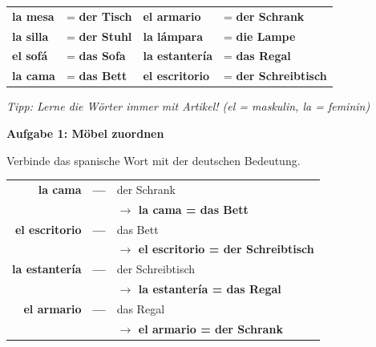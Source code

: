 \documentclass[11pt, a4paper]{article}
\newcommand{\fachfarbe}{spanisch}
\newcommand{\punktebox}[1]{\hfill\fbox{\small \_/#1}}
\newcommand{\loesung}[1]{\textcolor{loesung}{\textbf{#1}}}
\newenvironment{aufgabe}[1]{%
    \needspace{5\baselineskip}%
    \nopagebreak[4]%
    \vspace{10pt}
    \noindent\textbf{\textcolor{\fachfarbe}{Aufgabe #1}}
    \nopagebreak[4]%
    \vspace{5pt}
    \nopagebreak[4]%
    \begin{list}{}{\leftmargin=0pt}
    \item[]
}{%
    \end{list}
}
\newcommand{\es}[1]{\textcolor{\fachfarbe}{\textbf{#1}}}
\begin{document}
\vspace{10pt}


\begin{merkkasten}

\vspace{0.5em}

\begin{tabular}{ll|ll}
\es{la mesa} & = \loesung{der Tisch} & \es{el armario} & = \loesung{der Schrank} \\[0.8em]
\es{la silla} & = \loesung{der Stuhl} & \es{la lámpara} & = \loesung{die Lampe} \\[0.8em]
\es{el sofá} & = \loesung{das Sofa} & \es{la estantería} & = \loesung{das Regal} \\[0.8em]
\es{la cama} & = \loesung{das Bett} & \es{el escritorio} & = \loesung{der Schreibtisch} \\
\end{tabular}

\vspace{0.5em}

\textit{Tipp: Lerne die Wörter immer mit Artikel! (el = maskulin, la = feminin)}

\end{merkkasten}

\vspace{15pt}


\begin{aufgabe}{1: Möbel zuordnen}
Verbinde das spanische Wort mit der deutschen Bedeutung. \punktebox{4}
\end{aufgabe}

\begin{center}
\begin{tabular}{rcl}
\es{la cama} & \loesung{---} & der Schrank \\[0.4em]
& & \loesung{$\rightarrow$ la cama = das Bett} \\[0.8em]
\es{el escritorio} & \loesung{---} & das Bett \\[0.4em]
& & \loesung{$\rightarrow$ el escritorio = der Schreibtisch} \\[0.8em]
\es{la estantería} & \loesung{---} & der Schreibtisch \\[0.4em]
& & \loesung{$\rightarrow$ la estantería = das Regal} \\[0.8em]
\es{el armario} & \loesung{---} & das Regal \\[0.4em]
& & \loesung{$\rightarrow$ el armario = der Schrank} \\
\end{tabular}
\end{center}
\end{document}
